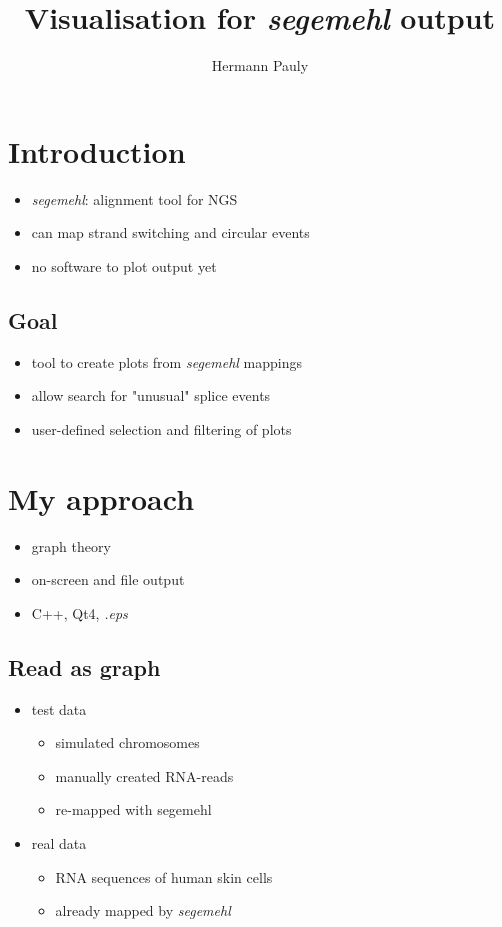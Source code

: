 \documentclass[presentation]{beamer}
\author{Hermann Pauly}
\date{}
\title{Visualisation for \emph{segemehl} output}
\begin{document}
\maketitle

\section*{Introduction}
\label{sec-1}

\begin{itemize}
\item \emph{segemehl}: alignment tool for NGS
\item can map strand switching and circular events
\item no software to plot output yet
\end{itemize}

\subsection*{Goal}
\label{sec-1-1}

\begin{itemize}
\item tool to create plots from \emph{segemehl} mappings
\item allow search for "unusual" splice events
\item user-defined selection and filtering of plots
\end{itemize}

\section*{My approach}
\label{sec-2}

\begin{itemize}
\item graph theory
\item on-screen and file output
\item C++, Qt4, \emph{.eps}
\end{itemize}

\subsection*{Read as graph}
\label{sec-2-1}

\begin{itemize}
\item test data
\begin{itemize}
\item simulated chromosomes
\item manually created RNA-reads
\item re-mapped with segemehl
\end{itemize}
\item real data
\begin{itemize}
\item RNA sequences of human skin cells
\item already mapped by \emph{segemehl}
\end{itemize}
\end{itemize}
\end{document}
